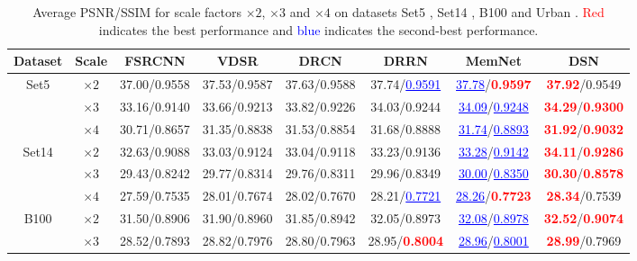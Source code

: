 \documentclass[runningheads]{llncs}
\begin{document}
\begin{table}[bht]
\center
\caption{Average PSNR/SSIM for scale factors $\times 2$, $\times 3$ and $\times 4$ on datasets Set5 \cite{set5}, Set14 \cite{set14}, B100 \cite{b100} and Urban \cite{selfex}. \textcolor{red}{Red} indicates the best performance and \textcolor{blue}{blue} indicates the second-best performance.}
\scriptsize
\renewcommand\arraystretch{1.3}
\begin{tabular}{|c|c|c|c|c|c|c|c|}
\hline
Dataset&Scale&FSRCNN \cite{fsrcnn}&VDSR \cite{vdsr}&DRCN \cite{drcn}&DRRN \cite{drrn}&MemNet \cite{memnet}& DSN\\
\hline
\hline
\multirow{3}{*}{Set5}&$\times 2$&37.00/0.9558&37.53/0.9587&37.63/0.9588&37.74/\textcolor{blue}{\underline{0.9591}}&\textcolor{blue}{\underline{37.78}}/\textcolor{red}{\textbf{0.9597}}&\textcolor{red}{\textbf{37.92}}/0.9549\\
&$\times 3$&33.16/0.9140&33.66/0.9213&33.82/0.9226&34.03/0.9244&\textcolor{blue}{\underline{34.09}}/\textcolor{blue}{\underline{0.9248}}&\textcolor{red}{\textbf{34.29}}/\textcolor{red}{\textbf{0.9300}}\\
&$\times 4$&30.71/0.8657&31.35/0.8838&31.53/0.8854&31.68/0.8888&\textcolor{blue}{\underline{31.74}}/\textcolor{blue}{\underline{0.8893}}&\textcolor{red}{\textbf{31.92}}/\textcolor{red}{\textbf{0.9032}}\\
\hline
\hline
\multirow{3}{*}{Set14}&$\times 2$&32.63/0.9088&33.03/0.9124&33.04/0.9118&33.23/0.9136&\textcolor{blue}{\underline{33.28}}/\textcolor{blue}{\underline{0.9142}}&\textcolor{red}{\textbf{34.11}}/\textcolor{red}{\textbf{0.9286}}\\
&$\times 3$&29.43/0.8242&29.77/0.8314&29.76/0.8311&29.96/0.8349&\textcolor{blue}{\underline{30.00}}/\textcolor{blue}{\underline{0.8350}}&\textcolor{red}{\textbf{30.30}}/\textcolor{red}{\textbf{0.8578}}\\
&$\times 4$&27.59/0.7535&28.01/0.7674&28.02/0.7670&28.21/\textcolor{blue}{\underline{0.7721}}&\textcolor{blue}{\underline{28.26}}/\textcolor{red}{\textbf{0.7723}}&\textcolor{red}{\textbf{28.34}}/0.7539\\
\hline
\hline
\multirow{3}{*}{B100}&$\times 2$&31.50/0.8906&31.90/0.8960&31.85/0.8942&32.05/0.8973&\textcolor{blue}{\underline{32.08}}/\textcolor{blue}{\underline{0.8978}}&\textcolor{red}{\textbf{32.52}}/\textcolor{red}{\textbf{0.9074}}\\
&$\times 3$&28.52/0.7893&28.82/0.7976&28.80/0.7963&28.95/\textcolor{red}{\textbf{0.8004}}&\textcolor{blue}{\underline{28.96}}/\textcolor{blue}{\underline{0.8001}}&\textcolor{red}{\textbf{28.99}}/0.7969\\

\end{tabular}
\end{table}
\end{document}
